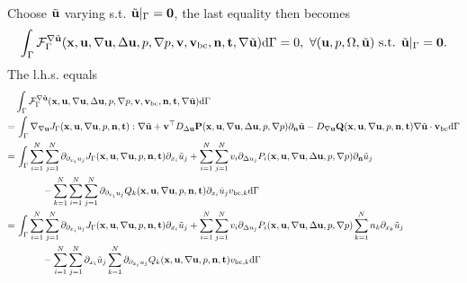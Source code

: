 \documentclass[oneside]{book}
\numberwithin{equation}{section}
\begin{document}
\begin{itemize}[leftmargin=0in]
\begin{itemize}
\begin{align*}
        \end{align*}
        Choose $\tilde{\bf u}$ varying s.t. $\tilde{\bf u}|_\Gamma = {\bf 0}$, the last equality then becomes
        \begin{align*}
            \int_\Gamma \mathcal{F}_\Gamma^{\nabla\tilde{\bf u}}({\bf x},{\bf u},\nabla{\bf u},\Delta{\bf u},p,\nabla p,{\bf v},{\bf v}_{\rm bc},{\bf n},{\bf t},\nabla\tilde{\bf u}){\rm d}\Gamma = 0,\ \forall({\bf u},p,\Omega,\tilde{\bf u}) \mbox{ s.t. } \tilde{\bf u}|_\Gamma = {\bf 0}.
        \end{align*}    
        The l.h.s. equals
        \begin{align*}
            &\int_\Gamma \mathcal{F}_\Gamma^{\nabla\tilde{\bf u}}({\bf x},{\bf u},\nabla{\bf u},\Delta{\bf u},p,\nabla p,{\bf v},{\bf v}_{\rm bc},{\bf n},{\bf t},\nabla\tilde{\bf u}){\rm d}\Gamma\\
            =&\, \int_\Gamma \nabla_{\nabla{\bf u}}J_\Gamma({\bf x},{\bf u},\nabla{\bf u},p,{\bf n},{\bf t}):\nabla\tilde{\bf u} + {\bf v}^\top D_{\Delta{\bf u}}{\bf P}({\bf x},{\bf u},\nabla{\bf u},\Delta{\bf u},p,\nabla p)\partial_{\bf n}\tilde{\bf u} - D_{\nabla{\bf u}}{\bf Q}({\bf x},{\bf u},\nabla{\bf u},p,{\bf n},{\bf t})\nabla\tilde{\bf u}\cdot{\bf v}_{\rm bc}{\rm d}\Gamma\\
            =&\, \int_\Gamma \sum_{i=1}^N\sum_{j=1}^N \partial_{\partial_{x_i}u_j}J_\Gamma({\bf x},{\bf u},\nabla{\bf u},p,{\bf n},{\bf t})\partial_{x_i}\tilde{u}_j + \sum_{i=1}^N\sum_{j=1}^N v_i\partial_{\Delta u_j}P_i({\bf x},{\bf u},\nabla{\bf u},\Delta{\bf u},p,\nabla p)\partial_{\bf n}\tilde{u}_j\\
            &\hspace{1cm}- \sum_{k=1}^N\sum_{i=1}^N\sum_{j=1}^N \partial_{\partial_{x_i}u_j}Q_k({\bf x},{\bf u},\nabla{\bf u},p,{\bf n},{\bf t})\partial_{x_i}\tilde{u}_jv_{{\rm bc},k}{\rm d}\Gamma\\
            =&\, \int_\Gamma \sum_{i=1}^N\sum_{j=1}^N \partial_{\partial_{x_i}u_j}J_\Gamma({\bf x},{\bf u},\nabla{\bf u},p,{\bf n},{\bf t})\partial_{x_i}\tilde{u}_j + \sum_{i=1}^N\sum_{j=1}^N v_i\partial_{\Delta u_j}P_i({\bf x},{\bf u},\nabla{\bf u},\Delta{\bf u},p,\nabla p)\sum_{k=1}^N n_k\partial_{x_k}\tilde{u}_j\\
            &\hspace{1cm}- \sum_{i=1}^N\sum_{j=1}^N \partial_{x_i}\tilde{u}_j\sum_{k=1}^N\partial_{\partial_{x_i}u_j}Q_k({\bf x},{\bf u},\nabla{\bf u},p,{\bf n},{\bf t})v_{{\rm bc},k}{\rm d}\Gamma\\

\end{align*}
\end{itemize}
\end{itemize}
\end{document}
